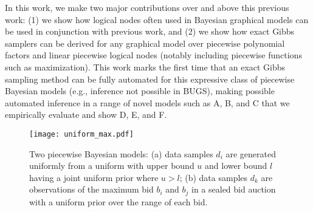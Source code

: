 \documentclass[letterpaper]{article}
\renewcommand{\-}{\text{-}}
\begin{document}
In this work, we make two major contributions over and above this
previous work: (1) we show how logical nodes often used in Bayesian
graphical models can be used in conjunction with previous work, and
(2) we show how exact Gibbs samplers can be derived for any graphical
model over piecewise polynomial factors and linear piecewise logical
nodes (notably including piecewise functions such as maximization).
This work marks the first time that an exact Gibbs sampling method can
be fully automated for this expressive class of piecewise Bayesian
models (e.g., inference not possible in BUGS), making possible
automated inference in a range of novel models such as A, B, and C
that we empirically evaluate and show D, E, and F.

\begin{figure}[t!]
\centering
\texttt{[image: uniform\_max.pdf]}
\vspace{-6mm}
\caption{\footnotesize Two piecewise Bayesian models: 
(a) data samples $d_i$ are generated uniformly from a uniform with 
upper bound $u$ and lower bound $l$ having a joint uniform prior where $u > l$;
(b) data samples $d_k$ are observations of the maximum bid $b_i$ and $b_j$
in a sealed bid auction with a uniform prior over the range of each bid.}
\label{fig:uniform_max}
\vspace{-4mm}
\end{figure}


%
\end{document}
